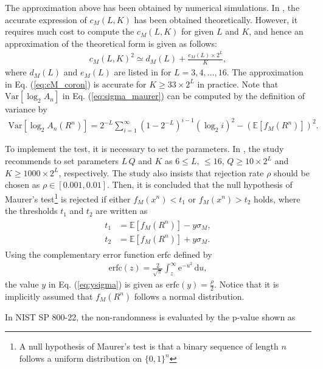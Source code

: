 The approximation above has been obtained by numerical simulations. 
%
In \cite{coron1998accurate}, the accurate expression of $c_M(L,K)$ has been obtained theoretically. 
However, it requires much cost to compute the $c_M(L,K)$ for given $L$ and $K$, and hence an approximation of the theoretical form is given as follows:
\begin{align}\label{eq:cM_coron}
	c_M(L,K)^2 \simeq d_M(L) + \frac{e_M(L)\times2^L}{K}, 
\end{align} 
where $d_M(L)$ and $e_M(L)$ are listed in \cite{coron1998accurate} for $L=3,4,\dots,16$. 
The approximation in Eq. (\ref{eq:cM_coron}) is accurate for $K\geq 33\times 2^L$ in practice.
%
Note that $\mathrm{Var}[\log_2 A_n]$ in Eq. (\ref{eq:sigma_maurer}) can be computed by the definition of variance by
\begin{align}
 	\mathrm{Var}[\log_2 A_n(R^n)] = 2^{-L}\sum_{i=1}^{\infty}(1-2^{-L})^{i-1} (\log_2 i)^2 - (\mathbb{E}[f_M(R^n)])^2.
\end{align}
%
\par
%
To implement the test, it is necessary to set the parameters. In \cite{maurer1992universal}, the study recommends to set parameters $L\,Q$ and $K$ as $6\leq L,\, \leq 16$, $Q \geq 10 \times 2^L$ and $K \geq 1000\times 2^L$, respectively. 
%
The study also insists that rejection rate $\rho$ should be chosen as $\rho \in [0.001, 0.01]$. 
%
Then, it is concluded that the null hypothesis of Maurer's test\footnote{A null hypothesis of Maurer's test is that a binary sequence of length $n$ follows a uniform distribution on $\{0,1\}^n$} 
is rejected if either $f_M(x^n)<t_1$ or $f_M(x^n)>t_2$ holds, where the thresholds $t_1$ and $t_2$ are written as
\begin{align}\label{eq:ysigma}
\begin{split}
	t_1 &= \mathbb{E}[f_M(R^n)] - y\sigma_M, \\
	t_2 &= \mathbb{E}[f_M(R^n)] + y\sigma_M.
\end{split}
\end{align}
Using the complementary error function $\mathrm{erfc}$ defined by
\begin{align}
   \text{erfc}(z) = \frac{2}{\sqrt{\pi}} \int_{z}^{\infty} \mathrm{e}^{-u^2} \, \mathrm{d}u,
\end{align}
the value $y$ in Eq. (\ref{eq:ysigma}) is given as $\mathrm{erfc}(y)=\frac{\rho}{2}$. 
Notice that it is implicitly assumed that $f_M(R^n)$ follows a normal distribution.
%
\par
In NIST SP 800-22, the non-randomness is evaluated by the p-value shown as
